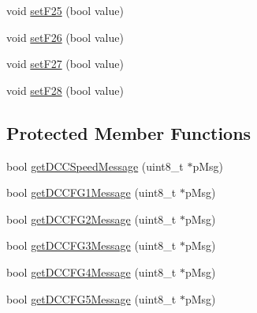 \begin{DoxyCompactItemize}
\item 
void \hyperlink{classTBT_1_1LocDecoder_aafefc743964ea0b01ff3ad51fee98033_aafefc743964ea0b01ff3ad51fee98033}{set\+F25} (bool value)
\item 
void \hyperlink{classTBT_1_1LocDecoder_a646c6edc6515dadaebac9b06a0907a9e_a646c6edc6515dadaebac9b06a0907a9e}{set\+F26} (bool value)
\item 
void \hyperlink{classTBT_1_1LocDecoder_a7584ffb3eaf00b83b48217081049ff59_a7584ffb3eaf00b83b48217081049ff59}{set\+F27} (bool value)
\item 
void \hyperlink{classTBT_1_1LocDecoder_a66c6f1dcd471f19d019018ed3eed2e0f_a66c6f1dcd471f19d019018ed3eed2e0f}{set\+F28} (bool value)
\end{DoxyCompactItemize}
\subsection*{Protected Member Functions}
\begin{DoxyCompactItemize}
\item 
bool \hyperlink{classTBT_1_1LocDecoder_a34e4036b2f203797be32be1fb40c8e57_a34e4036b2f203797be32be1fb40c8e57}{get\+D\+C\+C\+Speed\+Message} (uint8\+\_\+t $\ast$p\+Msg)
\item 
bool \hyperlink{classTBT_1_1LocDecoder_a700ed0ccf6faf273831ba96727714646_a700ed0ccf6faf273831ba96727714646}{get\+D\+C\+C\+F\+G1\+Message} (uint8\+\_\+t $\ast$p\+Msg)
\item 
bool \hyperlink{classTBT_1_1LocDecoder_a7901f5894517bb5218d6955e74348f4b_a7901f5894517bb5218d6955e74348f4b}{get\+D\+C\+C\+F\+G2\+Message} (uint8\+\_\+t $\ast$p\+Msg)
\item 
bool \hyperlink{classTBT_1_1LocDecoder_a15c5dcaf68e2ea8522ad81ae7c897d3f_a15c5dcaf68e2ea8522ad81ae7c897d3f}{get\+D\+C\+C\+F\+G3\+Message} (uint8\+\_\+t $\ast$p\+Msg)
\item 
bool \hyperlink{classTBT_1_1LocDecoder_a4558d6f31f10579bd0ee526ee453dedd_a4558d6f31f10579bd0ee526ee453dedd}{get\+D\+C\+C\+F\+G4\+Message} (uint8\+\_\+t $\ast$p\+Msg)
\item 
bool \hyperlink{classTBT_1_1LocDecoder_af25136b90116412d8163fde688893061_af25136b90116412d8163fde688893061}{get\+D\+C\+C\+F\+G5\+Message} (uint8\+\_\+t $\ast$p\+Msg)
\end{DoxyCompactItemize}
